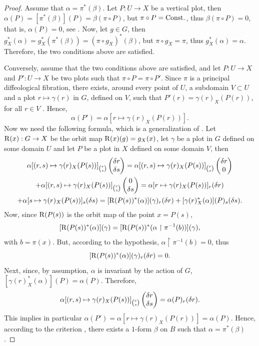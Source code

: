 \begin{proof}
  Assume that $\alpha = \pi^*(\beta)$.
  Let $P : U \to X$ be a vertical plot,
  then $\alpha(P) = [\pi^*(\beta)](P) = \beta(\pi \circ P)$,
  but $\pi \circ P = \mathrm{Const.}$,
  thus $\beta(\pi \circ P) = 0$,
  that is,
  $\alpha(P) = 0$,
  see \cite[Exercise 96]{PIZ13}.
  Now,
  let $g \in G$,
  then $g_X^*(\alpha) = g_X^*(\pi^*(\beta)) = (\pi \circ g_X)^*(\beta)$,
  but $\pi \circ g_X = \pi$,
  thus $g_X^*(\alpha) = \alpha$.
  Therefore,
  the two conditions above are satisfied.
  
  Conversely,
  assume that the two conditions above are satisfied,
  and let $P : U \to X$ and $P' : U \to X$ be two plots such that $\pi \circ P = \pi \circ P'$.
  Since $\pi$ is a principal diffeological fibration,
  there exists, around every point of $U$,
  a subdomain $V \subset U$ and a plot $r \mapsto \gamma(r)$ in $G$,
  defined on $V$,
  such that
  $P'(r) = \gamma(r)_X(P(r))$,
  for all $r \in V$ \cite[8.13, Note 1]{PIZ13}.
  Hence,
  \vspace{-.33\baselineskip} %
  $$%
    \alpha(P') = \alpha[r \mapsto \gamma(r)_X(P(r))].
    $$%
  Now we need the following formula,
  which is a generalization of
  \cite[8.37 $(\clubsuit)$]{PIZ13}.
  Let $\operatorname{R}(x) : G \to X$ be
  the orbit map $\operatorname{R}(x)(g) = g_X(x)$, let $\gamma$ be a plot in $G$
  defined on some domain $U$ and let $P$ be a plot
  in $X$ defined on some domain $V$,
  then
  \begin{multline*}
    \alpha[(r,s) \mapsto \gamma(r)_X(P(s))]_{r \choose s}\begin{pmatrix}\delta r \\ \delta s\end{pmatrix} = \alpha[(r,s) \mapsto \gamma(r)_X(P(s))]_{r \choose s}\begin{pmatrix}\delta r \\ 0\end{pmatrix} \\
    + \alpha[(r,s) \mapsto \gamma(r)_X(P(s))]_{r \choose s}\begin{pmatrix}0 \\ \delta s\end{pmatrix}  = \alpha[r \mapsto \gamma(r)_X(P(s))]_r (\delta r) \\
    + \alpha[s \mapsto \gamma(r)_X(P(s))]_s(\delta s) =  [\operatorname{R}(P(s))^*(\alpha)](\gamma)_r(\delta r) +  [\gamma(r)_X^*(\alpha)](P)_s(\delta s).
  \end{multline*}
  Now,
  since $\operatorname{R}(P(s))$ is the orbit map of the point $x = P(s)$,
  $$
    [\operatorname{R}(P(s))^*(\alpha)](\gamma) = [\operatorname{R}(P(s))^*(\alpha \restriction \pi^{-1}(b))](\gamma),
    $$
  with $b = \pi(x)$. But, according to the hypothesis, $\alpha \restriction \pi^{-1}(b) = 0$, thus
  $$
    [\operatorname{R}(P(s))^*(\alpha)](\gamma)_r(\delta r) = 0.
    $$
  Next,
  since,
  by assumption,
  $\alpha$ is invariant by the action of $G$,
  $[\gamma(r)_X^*(\alpha)](P) = \alpha(P)$.
  Therefore,
  $$
    \alpha[(r,s) \mapsto \gamma(r)_X(P(s))]_{r \choose s}\begin{pmatrix}\delta r \\ \delta s\end{pmatrix}
    = \alpha(P)_r(\delta r).
    $$
  This implies in particular $\alpha(P') = \alpha[r \mapsto \gamma(r)_X(P(r))] =
  \alpha(P)$.
  Hence,
  according to the criterion \cite[6.38]{PIZ13},
  there exists a $1$-form
  $\beta$ on $B$ such that $\alpha = \pi^*(\beta)$.
  

\end{proof}
